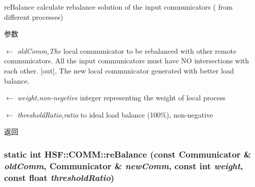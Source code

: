 reBalance calculate rebalance solution of the input communicators ( from different processes) 
\begin{DoxyParams}{参数}
\item[\mbox{$\leftarrow$} {\em oldComm,The}]local communicator to be rebalanced with other remote communicators. All the input communicators must have NO intersections with each other. \mbox{[}out\mbox{]}, The new local communicator generated with better load balance. \item[\mbox{$\leftarrow$} {\em weight,non-\/negetive}]integer representing the weight of local process \item[\mbox{$\leftarrow$} {\em thresholdRatio,ratio}]to ideal load balance (100\%), non-\/negative \end{DoxyParams}
\begin{DoxyReturn}{返回}

\end{DoxyReturn}
\hypertarget{classHSF_1_1COMM_aaaf021a10daa5fbfa85102953a0d8f1c}{
\subsubsection[{reBalance}]{\setlength{\rightskip}{0pt plus 5cm}static int HSF::COMM::reBalance (const {\bf Communicator} \& {\em oldComm}, \/  {\bf Communicator} \& {\em newComm}, \/  const int {\em weight}, \/  const float {\em thresholdRatio})}}
\label{classHSF_1_1COMM_aaaf021a10daa5fbfa85102953a0d8f1c}


